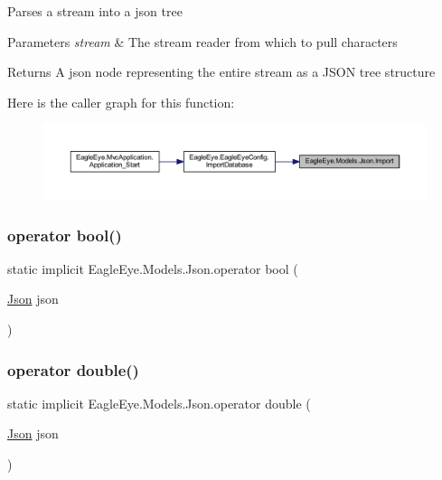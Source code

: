 Parses a stream into a json tree 


\begin{DoxyParams}{Parameters}
{\em stream} & The stream reader from which to pull characters\\
\hline
\end{DoxyParams}
\begin{DoxyReturn}{Returns}
A json node representing the entire stream as a J\+S\+ON tree structure
\end{DoxyReturn}
Here is the caller graph for this function\+:\nopagebreak
\begin{figure}[H]
\begin{center}
\leavevmode
\includegraphics[width=350pt]{class_eagle_eye_1_1_models_1_1_json_ae79a899679f529bfebb18683afd1c9d1_icgraph}
\end{center}
\end{figure}
\mbox{\label{class_eagle_eye_1_1_models_1_1_json_a396aab5debc375cb57b9e2ce58c932fd}} 
\subsubsection{\texorpdfstring{operator bool()}{operator bool()}}
{\footnotesize\ttfamily static implicit Eagle\+Eye.\+Models.\+Json.\+operator bool (\begin{DoxyParamCaption}\item[{\mbox{\hyperlink{class_eagle_eye_1_1_models_1_1_json}{Json}}}]{json }\end{DoxyParamCaption})\hspace{0.3cm}{\ttfamily [static]}}

\mbox{\label{class_eagle_eye_1_1_models_1_1_json_aa26017e55f0d47af0b446c02c0899102}} 
\subsubsection{\texorpdfstring{operator double()}{operator double()}}
{\footnotesize\ttfamily static implicit Eagle\+Eye.\+Models.\+Json.\+operator double (\begin{DoxyParamCaption}\item[{\mbox{\hyperlink{class_eagle_eye_1_1_models_1_1_json}{Json}}}]{json }\end{DoxyParamCaption})\hspace{0.3cm}{\ttfamily [static]}}

